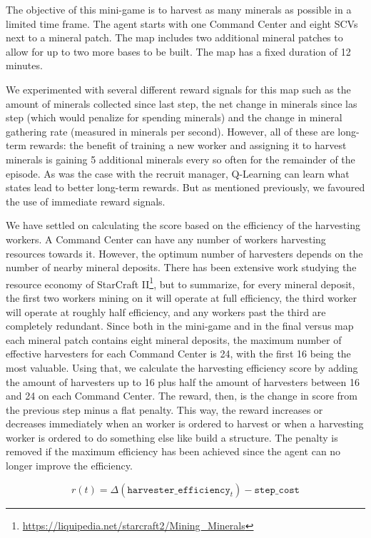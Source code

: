 The objective of this mini-game is to harvest as many minerals as possible in a limited time frame. The agent starts with one Command Center and eight SCVs next to a mineral patch. The map includes two additional mineral patches to allow for up to two more bases to be built. The map has a fixed duration of 12 minutes.

We experimented with several different reward signals for this map such as the amount of minerals collected since last step, the net change in minerals since las step (which would penalize for spending minerals) and the change in mineral gathering rate (measured in minerals per second). However, all of these are long-term rewards: the benefit of training a new worker and assigning it to harvest minerals is gaining 5 additional minerals every so often for the remainder of the episode. As was the case with the recruit manager, Q-Learning can learn what states lead to better long-term rewards. But as mentioned previously, we favoured the use of immediate reward signals.

We have settled on calculating the score based on the efficiency of the harvesting workers. A Command Center can have any number of workers harvesting resources towards it. However, the optimum number of harvesters depends on the number of nearby mineral deposits. There has been extensive work studying the resource economy of StarCraft II\footnote{\url{https://liquipedia.net/starcraft2/Mining_Minerals}}, but to summarize, for every mineral deposit, the first two workers mining on it will operate at full efficiency, the third worker will operate at roughly half efficiency, and any workers past the third are completely redundant. Since both in the mini-game and in the final versus map each mineral patch contains eight mineral deposits, the maximum number of effective harvesters for each Command Center is 24, with the first 16 being the most valuable. Using that, we calculate the harvesting efficiency score by adding the amount of harvesters up to 16 plus half the amount of harvesters between 16 and 24 on each Command Center. The reward, then, is the change in score from the previous step minus a flat penalty. This way, the reward increases or decreases immediately when an worker is ordered to harvest or when a harvesting worker is ordered to do something else like build a structure. The penalty is removed if the maximum efficiency has been achieved since the agent can no longer improve the efficiency.

$$
r(t) = \Delta(\texttt{harvester\_efficiency}_{t}) - \texttt{step\_cost}
$$

